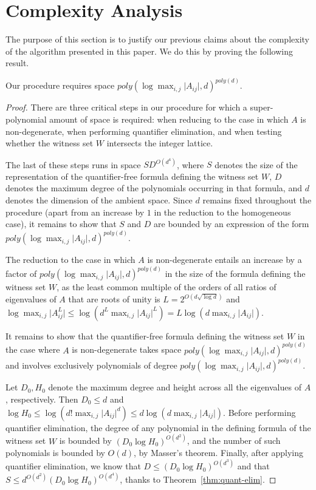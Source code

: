 \section{Complexity Analysis}
\label{sec:complexity}

The purpose of this section is to justify our previous claims about
the complexity of the algorithm presented in this paper. We do this by
proving the following result.

\begin{proposition}
Our procedure requires space $\mathit{poly}(\log\max_{i,j}\lvert A_{ij}\rvert,d)^{\mathit{poly}(d)}$.
\end{proposition}

\begin{proof}
There are three critical steps in our procedure for which a
super-polynomial amount of space is required: when reducing to the
case in which $A$ is non-degenerate, when performing quantifier
elimination, and when testing whether the witness set $W$ intersects
the integer lattice.

The last of these steps runs in space $SD^{O(d^4)}$, where $S$ denotes
the size of the representation of the quantifier-free formula defining
the witness set $W$, $D$ denotes the maximum degree of the polynomials
occurring in that formula, and $d$ denotes the dimension of the
ambient space. Since $d$ remains fixed throughout the procedure (apart
from an increase by $1$ in the reduction to the homogeneous case), it
remains to show that $S$ and $D$ are bounded by an expression of the
form $\mathit{poly}(\log\max_{i,j}\lvert
A_{ij}\rvert,d)^{\mathit{poly}(d)}$.

The reduction to the case in which $A$ is non-degenerate entails an
increase by a factor of $\mathit{poly}(\log\max_{i,j}\lvert
A_{ij}\rvert,d)^{\mathit{poly}(d)}$ in the size of the formula
defining the witness set $W$, as the least common multiple of the
orders of all ratios of eigenvalues of $A$ that are roots of unity is
$L=2^{O(d\sqrt{\log d})}$ and $\log\max_{i,j}\lvert A^L_{ij}\rvert\leq
\log (d^L\max_{i,j}\lvert A_{ij}\rvert^L)=L\log (d\max_{i,j}\lvert
A_{ij}\rvert)$.

It remains to show that the quantifier-free formula defining the witness set $W$ in the case where $A$ is non-degenerate takes space $\mathit{poly}(\log\max_{i,j}\lvert A_{ij}\rvert,d)^{\mathit{poly}(d)}$ and involves exclusively polynomials of degree $\mathit{poly}(\log\max_{i,j}\lvert A_{ij}\rvert,d)^{\mathit{poly}(d)}$.

Let $D_0,H_0$ denote the maximum degree and height across all the eigenvalues of $A$, respectively. Then $D_0\leq d$ and $\log H_0\leq\log (d!\max_{i,j}\lvert A_{ij}\rvert^d)\leq d\log (d\max_{i,j}\lvert A_{ij}\rvert)$. Before performing quantifier elimination, the degree of any polynomial in the defining formula of the witness set $W$ is bounded by $(D_0\log H_0)^{O(d^2)}$, and the number of such polynomials is bounded by $O(d)$, by Masser's theorem. Finally, after applying quantifier elimination, we know that $D\leq(D_0\log H_0)^{O(d^3)}$ and that $S\leq d^{O(d^2)}(D_0\log H_0)^{O(d^4)}$, thanks to Theorem~\ref{thm:quant-elim}.
\end{proof}
